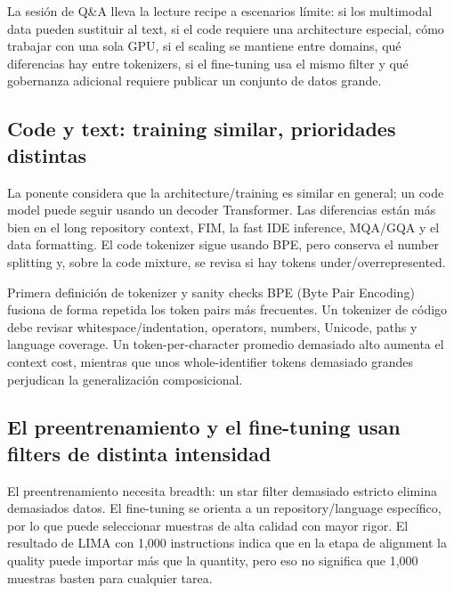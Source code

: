 \documentclass[a4paper]{article}
\begin{document}
La sesión de Q\&A lleva la lecture recipe a escenarios límite: si los multimodal data pueden sustituir al text, si el code requiere una architecture especial, cómo trabajar con una sola GPU, si el scaling se mantiene entre domains, qué diferencias hay entre tokenizers, si el fine-tuning usa el mismo filter y qué gobernanza adicional requiere publicar un conjunto de datos grande.

\subsection{Code y text: training similar, prioridades distintas}

La ponente considera que la architecture/training es similar en general; un code model puede seguir usando un decoder Transformer. Las diferencias están más bien en el long repository context, FIM, la fast IDE inference, MQA/GQA y el data formatting. El code tokenizer sigue usando BPE, pero conserva el number splitting y, sobre la code mixture, se revisa si hay tokens under/overrepresented.

\begin{knowledgebox}{Primera definición de tokenizer y sanity checks}
BPE (Byte Pair Encoding) fusiona de forma repetida los token pairs más frecuentes. Un tokenizer de código debe revisar whitespace/indentation, operators, numbers, Unicode, paths y language coverage. Un token-per-character promedio demasiado alto aumenta el context cost, mientras que unos whole-identifier tokens demasiado grandes perjudican la generalización composicional.
\end{knowledgebox}


\subsection{El preentrenamiento y el fine-tuning usan filters de distinta intensidad}

El preentrenamiento necesita breadth: un star filter demasiado estricto elimina demasiados datos. El fine-tuning se orienta a un repository/language específico, por lo que puede seleccionar muestras de alta calidad con mayor rigor. El resultado de LIMA con 1,000 instructions indica que en la etapa de alignment la quality puede importar más que la quantity, pero eso no significa que 1,000 muestras basten para cualquier tarea.
\end{document}

